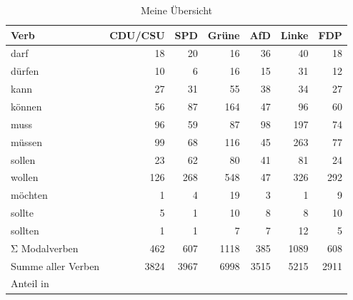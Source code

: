 \begin{table}
\caption{Meine Übersicht}
\label{tab:meine_tabelle}
\begin{tabular}{lrrrrrr}
\toprule
Verb & CDU/CSU & SPD & Grüne & AfD & Linke & FDP \\
\midrule
darf & 18 & 20 & 16 & 36 & 40 & 18 \\
dürfen & 10 & 6 & 16 & 15 & 31 & 12 \\
kann & 27 & 31 & 55 & 38 & 34 & 27 \\
können & 56 & 87 & 164 & 47 & 96 & 60 \\
muss & 96 & 59 & 87 & 98 & 197 & 74 \\
müssen & 99 & 68 & 116 & 45 & 263 & 77 \\
sollen & 23 & 62 & 80 & 41 & 81 & 24 \\
wollen & 126 & 268 & 548 & 47 & 326 & 292 \\
möchten & 1 & 4 & 19 & 3 & 1 & 9 \\
sollte & 5 & 1 & 10 & 8 & 8 & 10 \\
sollten & 1 & 1 & 7 & 7 & 12 & 5 \\
Σ Modalverben & 462 & 607 & 1118 & 385 & 1089 & 608 \\
Summe aller Verben & 3824 & 3967 & 6998 & 3515 & 5215 & 2911 \\
Anteil in %
\bottomrule
\end{tabular}
\end{table}
